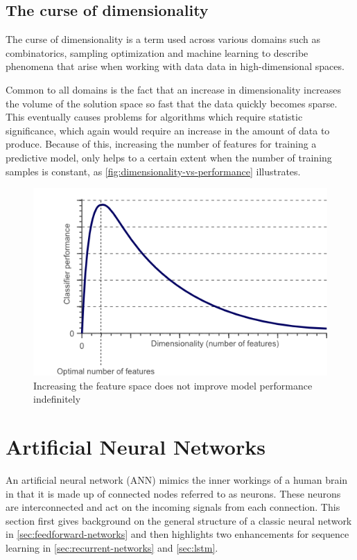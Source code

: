 \subsection{The curse of dimensionality}
The curse of dimensionality is a term used across various domains such as combinatorics, sampling optimization and machine learning to describe phenomena that arise when working with data data in high-dimensional spaces.

Common to all domains is the fact that an increase in dimensionality increases the volume of the solution space so fast that the data quickly becomes sparse. This eventually causes problems for algorithms which require statistic significance, which again would require an increase in the amount of data to produce.
Because of this, increasing the number of features for training a predictive model, only helps to a certain extent when the number of training samples is constant, as \autoref{fig:dimensionality-vs-performance} illustrates.

\begin{figure}
    \centering
    \includegraphics[width=.75\textwidth]{gfx/dimensionality_vs_performance.png}
    \caption{Increasing the feature space does not improve model performance indefinitely}
    \label{fig:dimensionality-vs-performance}
\end{figure}

\section{Artificial Neural Networks}\label{sec:artificial-neural-networks}
An artificial neural network (ANN) mimics the inner workings of a human brain in that it is made up of connected nodes referred to as neurons. These neurons are interconnected and act on the incoming signals from each connection. This section first gives background on the general structure of a classic neural network in \autoref{sec:feedforward-networks} and then highlights two enhancements for sequence learning in \autoref{sec:recurrent-networks} and \autoref{sec:lstm}.

